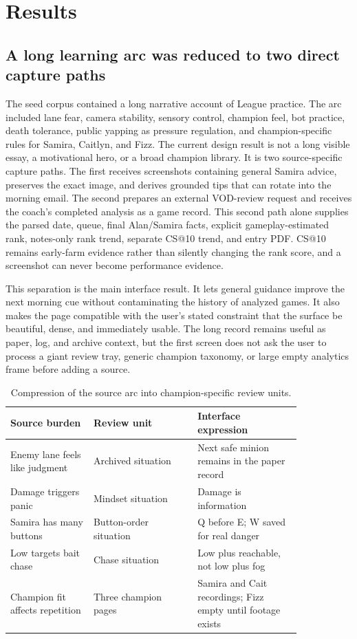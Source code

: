 \documentclass[12pt,letterpaper]{article}
\begin{document}
\section{Results}

\subsection{A long learning arc was reduced to two direct capture paths}

The seed corpus contained a long narrative account of League practice. The arc included lane fear, camera stability, sensory control, champion feel, bot practice, death tolerance, public yapping as pressure regulation, and champion-specific rules for Samira, Caitlyn, and Fizz. The current design result is not a long visible essay, a motivational hero, or a broad champion library. It is two source-specific capture paths. The first receives screenshots containing general Samira advice, preserves the exact image, and derives grounded tips that can rotate into the morning email. The second prepares an external VOD-review request and receives the coach's completed analysis as a game record. This second path alone supplies the parsed date, queue, final Alan/Samira facts, explicit gameplay-estimated rank, notes-only rank trend, separate CS@10 trend, and entry PDF. CS@10 remains early-farm evidence rather than silently changing the rank score, and a screenshot can never become performance evidence.

This separation is the main interface result. It lets general guidance improve the next morning cue without contaminating the history of analyzed games. It also makes the page compatible with the user's stated constraint that the surface be beautiful, dense, and immediately usable. The long record remains useful as paper, log, and archive context, but the first screen does not ask the user to process a giant review tray, generic champion taxonomy, or large empty analytics frame before adding a source.

\begin{table}[H]
\centering
\caption{Compression of the source arc into champion-specific review units.}
{\small
\setlength{\tabcolsep}{5pt}
\begin{tabular}{p{0.24\linewidth}p{0.30\linewidth}p{0.30\linewidth}}
\toprule
Source burden & Review unit & Interface expression \\
\midrule
Enemy lane feels like judgment & Archived situation & Next safe minion remains in the paper record \\
Damage triggers panic & Mindset situation & Damage is information \\
Samira has many buttons & Button-order situation & Q before E; W saved for real danger \\
Low targets bait chase & Chase situation & Low plus reachable, not low plus fog \\
Champion fit affects repetition & Three champion pages & Samira and Cait recordings; Fizz empty until footage exists \\
\bottomrule
\end{tabular}
}
\end{table}
\end{document}
